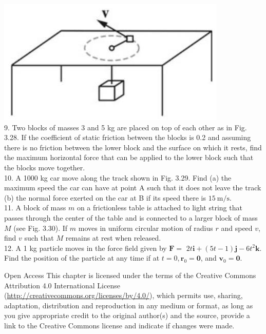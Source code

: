 \documentclass[10pt]{article}
\begin{document}
\includegraphics[max width=\textwidth, center]{2024_09_13_db1f357d2aad0a03eb2eg-060(1)}\\
9. Two blocks of masses 3 and 5 kg are placed on top of each other as in Fig. 3.28. If the coefficient of static friction between the blocks is 0.2 and assuming there is no friction between the lower block and the surface on which it rests, find the maximum horizontal force that can be applied to the lower block such that the blocks move together.\\
10. A 1000 kg car move along the track shown in Fig. 3.29. Find (a) the maximum speed the car can have at point A such that it does not leave the track (b) the normal force exerted on the car at B if its speed there is $15 \mathrm{~m} / \mathrm{s}$.\\
11. A block of mass $m$ on a frictionless table is attached to light string that passes through the center of the table and is connected to a larger block of mass $M$ (see Fig. 3.30). If $m$ moves in uniform circular motion of radius $r$ and speed $v$, find $v$ such that $M$ remains at rest when released.\\
12. A 1 kg particle moves in the force field given by $\mathbf{F}=$ $2 t \mathbf{i}+(5 t-1) \mathbf{j}-6 t^{2} \mathbf{k}$. Find the position of the particle at any time if at $t=0, \mathbf{r}_{0}=\mathbf{0}$, and $\mathbf{v}_{0}=\mathbf{0}$.

Open Access This chapter is licensed under the terms of the Creative Commons Attribution 4.0 International License (\href{http://creativecommons.org/licenses/by/4.0/}{http://creativecommons.org/licenses/by/4.0/}), which permits use, sharing, adaptation, distribution and reproduction in any medium or format, as long as you give appropriate credit to the original author(s) and the source, provide a link to the Creative Commons license and indicate if changes were made.
\end{document}
